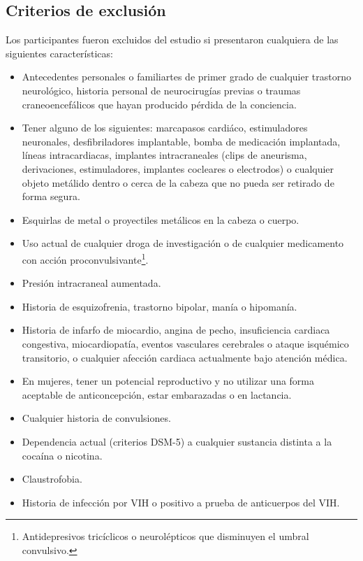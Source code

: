 \subsection{Criterios de exclusión}
Los participantes fueron excluidos del estudio si presentaron cualquiera de las siguientes características:
\begin{itemize}
    \item Antecedentes personales o familiartes de primer grado de cualquier trastorno neurológico, historia personal de neurocirugías previas o traumas craneoencefálicos que hayan producido pérdida de la conciencia.
    \item Tener alguno de los siguientes: marcapasos cardiáco, estimuladores neuronales, desfibriladores implantable, bomba de medicación implantada, líneas intracardiacas, implantes intracraneales (clips de aneurisma, derivaciones, estimuladores, implantes cocleares o electrodos) o cualquier objeto metálido dentro o cerca de la cabeza que no pueda ser retirado de forma segura.
    \item Esquirlas de metal o proyectiles metálicos en la cabeza o cuerpo.
    \item Uso actual de cualquier droga de investigación o de cualquier medicamento con acción proconvulsivante\footnote{Antidepresivos tricíclicos o neurolépticos que disminuyen el umbral convulsivo.}.
    \item Presión intracraneal aumentada.
    \item Historia de esquizofrenia, trastorno bipolar, manía o hipomanía.
    \item Historia de infarfo de miocardio, angina de pecho, insuficiencia cardiaca congestiva, miocardiopatía, eventos vasculares cerebrales o ataque isquémico transitorio, o cualquier afección cardiaca actualmente bajo atención médica.
    \item En mujeres, tener un potencial reproductivo y no utilizar una forma aceptable de anticoncepción, estar embarazadas o en lactancia.
    \item Cualquier historia de convulsiones.
    \item Dependencia actual (criterios DSM-5) a cualquier sustancia distinta a la cocaína o nicotina.
    \item Claustrofobia.
    \item Historia de infección por VIH o positivo a prueba de anticuerpos del VIH.
\end{itemize}

